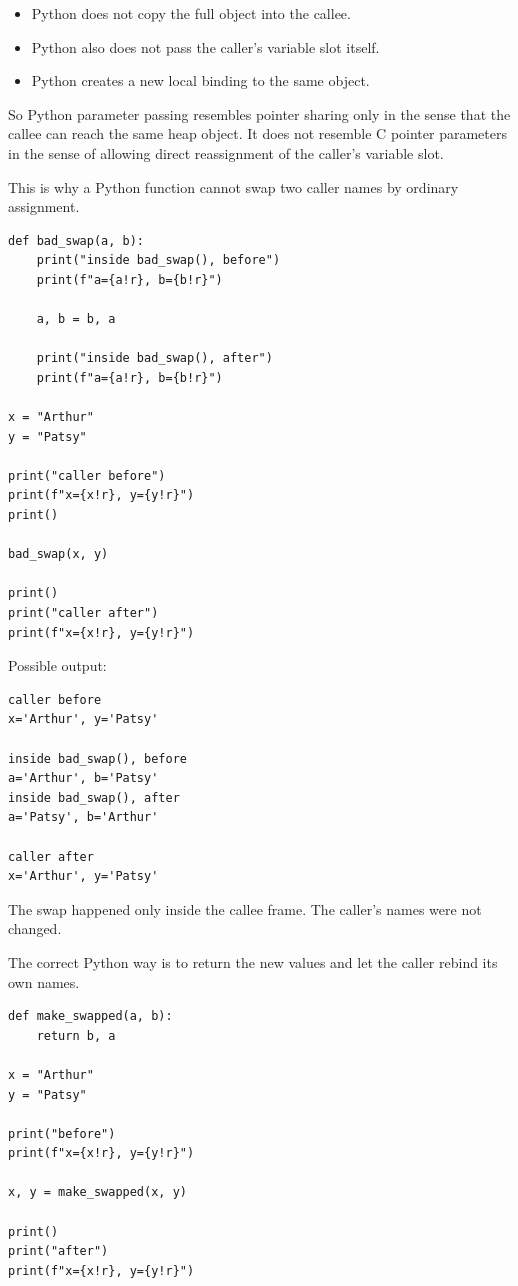 \begin{itemize}
    \item Python does not copy the full object into the callee.
    \item Python also does not pass the caller's variable slot itself.
    \item Python creates a new local binding to the same object.
\end{itemize}

So Python parameter passing resembles pointer sharing only in the sense that the callee can reach the same heap object. It does not resemble C pointer parameters in the sense of allowing direct reassignment of the caller's variable slot.

This is why a Python function cannot swap two caller names by ordinary assignment.

\begin{verbatim}
def bad_swap(a, b):
    print("inside bad_swap(), before")
    print(f"a={a!r}, b={b!r}")

    a, b = b, a

    print("inside bad_swap(), after")
    print(f"a={a!r}, b={b!r}")

x = "Arthur"
y = "Patsy"

print("caller before")
print(f"x={x!r}, y={y!r}")
print()

bad_swap(x, y)

print()
print("caller after")
print(f"x={x!r}, y={y!r}")
\end{verbatim}

Possible output:

\begin{verbatim}
caller before
x='Arthur', y='Patsy'

inside bad_swap(), before
a='Arthur', b='Patsy'
inside bad_swap(), after
a='Patsy', b='Arthur'

caller after
x='Arthur', y='Patsy'
\end{verbatim}

The swap happened only inside the callee frame. The caller's names were not changed.

The correct Python way is to return the new values and let the caller rebind its own names.

\begin{verbatim}
def make_swapped(a, b):
    return b, a

x = "Arthur"
y = "Patsy"

print("before")
print(f"x={x!r}, y={y!r}")

x, y = make_swapped(x, y)

print()
print("after")
print(f"x={x!r}, y={y!r}")
\end{verbatim}


